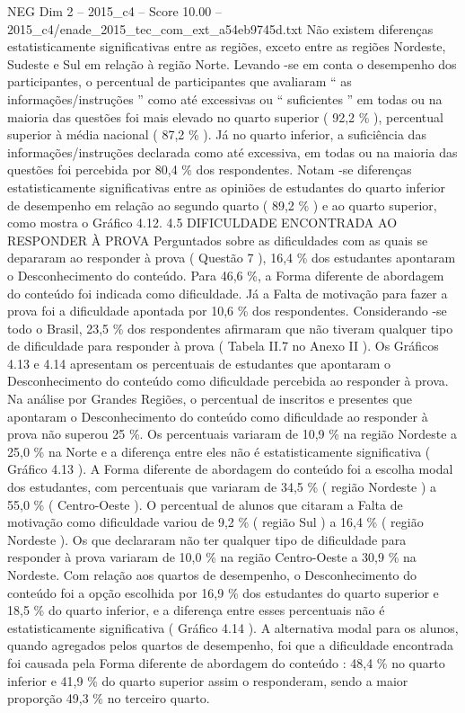 \begin{textsample}{NEG Dim 2 – 2015\_c4 – Score 10.00 – 2015\_c4/enade\_2015\_tec\_com\_ext\_a54eb9745d.txt}
Não existem diferenças estatisticamente significativas entre as regiões, exceto entre as regiões Nordeste, Sudeste e Sul em relação à região Norte.
Levando -se em conta o desempenho dos participantes, o percentual de participantes que avaliaram “ as informações/instruções ” como até excessivas ou “ suficientes ” em todas ou na maioria das questões foi mais elevado no quarto superior ( 92,2 \% ), percentual superior à média nacional ( 87,2 \% ).
Já no quarto inferior, a suficiência das informações/instruções declarada como até excessiva, em todas ou na maioria das questões foi percebida por 80,4 \% dos respondentes.
Notam -se diferenças estatisticamente significativas entre as opiniões de estudantes do quarto inferior de desempenho em relação ao segundo quarto ( 89,2 \% ) e ao quarto superior, como mostra o Gráfico 4.12. 4.5 DIFICULDADE ENCONTRADA AO RESPONDER À PROVA Perguntados sobre as dificuldades com as quais se depararam ao responder à prova ( Questão 7 ), 16,4 \% dos estudantes apontaram o Desconhecimento do conteúdo.
Para 46,6 \%, a Forma diferente de abordagem do conteúdo foi indicada como dificuldade.
Já a Falta de motivação para fazer a prova foi a dificuldade apontada por 10,6 \% dos respondentes.
Considerando -se todo o Brasil, 23,5 \% dos respondentes afirmaram que não tiveram qualquer tipo de dificuldade para responder à prova ( Tabela II.7 no Anexo II ).
Os Gráficos 4.13 e 4.14 apresentam os percentuais de estudantes que apontaram o Desconhecimento do conteúdo como dificuldade percebida ao responder à prova.
Na análise por Grandes Regiões, o percentual de inscritos e presentes que apontaram o Desconhecimento do conteúdo como dificuldade ao responder à prova não superou 25 \%.
Os percentuais variaram de 10,9 \% na região Nordeste a 25,0 \% na Norte e a diferença entre eles não é estatisticamente significativa ( Gráfico 4.13 ).
A Forma diferente de abordagem do conteúdo foi a escolha modal dos estudantes, com percentuais que variaram de 34,5 \% ( região Nordeste ) a 55,0 \% ( Centro-Oeste ).
O percentual de alunos que citaram a Falta de motivação como dificuldade variou de 9,2 \% ( região Sul ) a 16,4 \% ( região Nordeste ).
Os que declararam não ter qualquer tipo de dificuldade para responder à prova variaram de 10,0 \% na região Centro-Oeste a 30,9 \% na Nordeste.
Com relação aos quartos de desempenho, o Desconhecimento do conteúdo foi a opção escolhida por 16,9 \% dos estudantes do quarto superior e 18,5 \% do quarto inferior, e a diferença entre esses percentuais não é estatisticamente significativa ( Gráfico 4.14 ).
A alternativa modal para os alunos, quando agregados pelos quartos de desempenho, foi que a dificuldade encontrada foi causada pela Forma diferente de abordagem do conteúdo : 48,4 \% no quarto inferior e 41,9 \% do quarto superior assim o responderam, sendo a maior proporção 49,3 \% no terceiro quarto.

\end{textsample}
